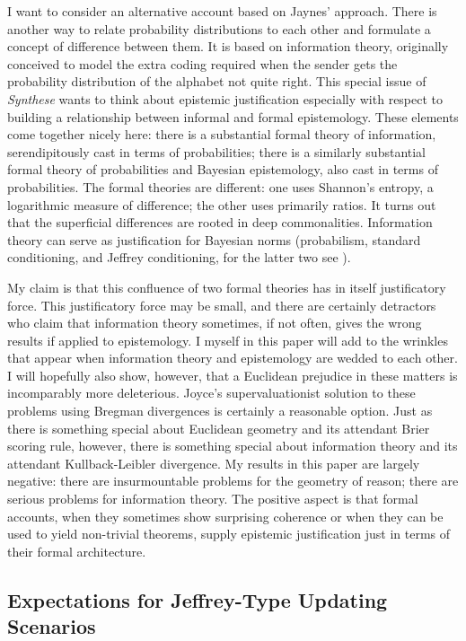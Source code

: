 \documentclass[smallextended]{svjour3}       %
\begin{document}
I want to consider an alternative account based on Jaynes' approach.
There is another way to relate probability distributions to each other
and formulate a concept of difference between them. It is based on
information theory, originally conceived to model the extra coding
required when the sender gets the probability distribution of the
alphabet not quite right. This special issue of \emph{Synthese} wants
to think about epistemic justification especially with respect to
building a relationship between informal and formal epistemology.
These elements come together nicely here: there is a substantial
formal theory of information, serendipitously cast in terms of
probabilities; there is a similarly substantial formal theory of
probabilities and Bayesian epistemology, also cast in terms of
probabilities. The formal theories are different: one uses Shannon's
entropy, a logarithmic measure of difference; the other uses primarily
ratios. It turns out that the superficial differences are rooted in
deep commonalities. Information theory can serve as justification for
Bayesian norms (probabilism, standard conditioning, and Jeffrey
conditioning, for the latter two see ).

My claim is that this confluence of two formal theories has in itself
justificatory force. This justificatory force may be small, and there
are certainly detractors who claim that information theory sometimes,
if not often, gives the wrong results if applied to epistemology. I
myself in this paper will add to the wrinkles that appear when
information theory and epistemology are wedded to each other. I will
hopefully also show, however, that a Euclidean prejudice in these
matters is incomparably more deleterious. Joyce's supervaluationist
solution to these problems using Bregman divergences is certainly a
reasonable option. Just as there is something special about Euclidean
geometry and its attendant Brier scoring rule, however, there is
something special about information theory and its attendant
Kullback-Leibler divergence. My results in this paper are largely
negative: there are insurmountable problems for the geometry of
reason; there are serious problems for information theory. The
positive aspect is that formal accounts, when they sometimes show
surprising coherence or when they can be used to yield non-trivial
theorems, supply epistemic justification just in terms of their formal
architecture.

\subsection{Expectations for Jeffrey-Type Updating Scenarios}
\label{subsec:vidiedoo}
\end{document}
